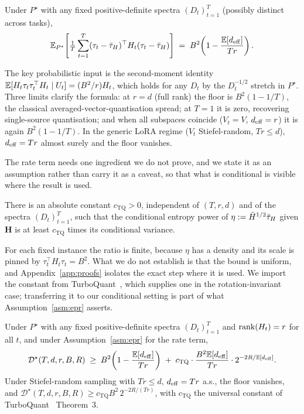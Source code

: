 \begin{lemma}\label{lem:floor-general}
Under $P^\star$ with any fixed positive-definite spectra
$(D_t)_{t=1}^T$ (possibly distinct across tasks),
\begin{equation}\label{eq:floor-closed}
  \mathbb{E}_{P^\star}\!\left[\tfrac1T\sum_{t=1}^T(\tau_t-\bar{\tau}_H)^\top
   H_t(\tau_t-\bar{\tau}_H)\right]
  \;=\; B^2\!\left(1 - \frac{\mathbb{E}[d_{\mathrm{eff}}]}{Tr}\right).
\end{equation}
\end{lemma}

The key probabilistic input is the second-moment identity
$\mathbb{E}[H_t\tau_t\tau_t^\top H_t\mid U_t] = (B^2/r) H_t$, which holds for
any $D_t$ by the $D_t^{-1/2}$ stretch in $P^\star$. Three limits
clarify the formula: at $r = d$ (full rank) the floor is
$B^2(1 - 1/T)$, the classical averaged-vector-quantisation spread; at
$T = 1$ it is zero, recovering single-source quantisation; and when
all subspaces coincide ($V_t = V$, $d_{\mathrm{eff}} = r$) it is again
$B^2(1 - 1/T)$. In the generic LoRA regime ($V_t$ Stiefel-random,
$Tr \leq d$), $d_{\mathrm{eff}} = Tr$ almost surely and the floor vanishes.

The rate term needs one ingredient we do not prove, and we state it as an
assumption rather than carry it as a caveat, so that what is conditional is
visible where the result is used.

\begin{assumption}\label{asm:epr}
There is an absolute constant $c_{\mathrm{TQ}} > 0$, independent of
$(T, r, d)$ and of the spectra $(D_t)_{t=1}^T$, such that the conditional
entropy power of $\eta := \bar H^{1/2}\bar{\tau}_H$ given $\boldsymbol H$ is at least
$c_{\mathrm{TQ}}$ times its conditional variance.
\end{assumption}

For each fixed instance the ratio is finite, because $\eta$ has a density and
its scale is pinned by $\tau_t^\top H_t \tau_t = B^2$. What we do not establish
is that the bound is uniform, and Appendix~\ref{app:proofs} isolates the exact
step where it is used. We import the constant from
TurboQuant~\citep{zandieh2025turboquant}, which supplies one in the
rotation-invariant case; transferring it to our conditional setting is part of
what Assumption~\ref{asm:epr} asserts.

\begin{theorem}\label{thm:general}
Under $P^\star$ with any fixed positive-definite spectra
$(D_t)_{t=1}^T$ and $\operatorname{rank}(H_t) = r$ for all $t$, and under
Assumption~\ref{asm:epr} for the rate term,
\begin{equation}\label{eq:thm-lb}
  \mathcal{D}^\star(T, d, r, B, R)
  \;\geq\;
  B^2\!\left(1 - \frac{\mathbb{E}[d_{\mathrm{eff}}]}{Tr}\right)
  \;+\; c_{\mathrm{TQ}}\cdot\frac{B^2\mathbb{E}[d_{\mathrm{eff}}]}{Tr}
  \cdot 2^{-2R/\mathbb{E}[d_{\mathrm{eff}}]}.
\end{equation}
Under Stiefel-random sampling with $Tr\leq d$, $d_{\mathrm{eff}} = Tr$ a.s., the
floor vanishes, and
$\mathcal{D}^\star(T,d,r,B,R) \geq c_{\mathrm{TQ}} B^2\,
2^{-2R/(Tr)}$, with $c_{\mathrm{TQ}}$ the universal constant of
TurboQuant~\citep{zandieh2025turboquant} Theorem~3.
\end{theorem}

